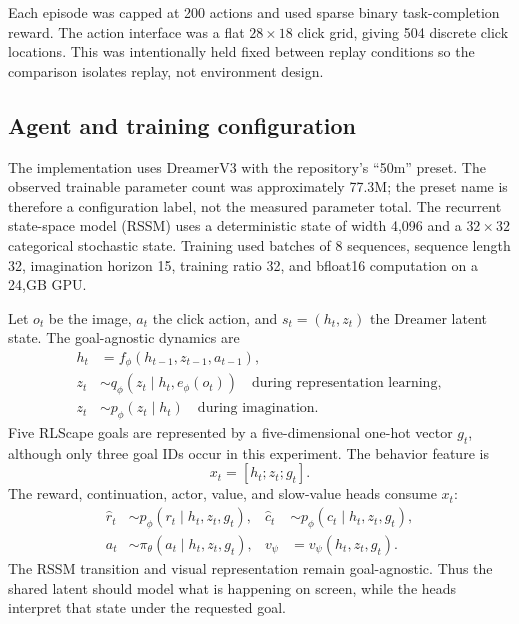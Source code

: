 \documentclass[10pt]{article}
\begin{document}
Each episode was capped at 200 actions and used sparse binary task-completion reward. The action interface was a flat $28\times18$ click grid, giving 504 discrete click locations. This was intentionally held fixed between replay conditions so the comparison isolates replay, not environment design.

\subsection{Agent and training configuration}

The implementation uses DreamerV3 \citep{hafner2023dreamerv3} with the repository's ``50m'' preset. The observed trainable parameter count was approximately 77.3M; the preset name is therefore a configuration label, not the measured parameter total. The recurrent state-space model (RSSM) uses a deterministic state of width 4,096 and a $32\times32$ categorical stochastic state. Training used batches of 8 sequences, sequence length 32, imagination horizon 15, training ratio 32, and bfloat16 computation on a 24,GB GPU.

Let $o_t$ be the image, $a_t$ the click action, and $s_t=(h_t,z_t)$ the Dreamer latent state. The goal-agnostic dynamics are
\begin{align}
 h_t &= f_\phi(h_{t-1},z_{t-1},a_{t-1}),\\
 z_t &\sim q_\phi(z_t\mid h_t,e_\phi(o_t)) \quad\text{during representation learning},\\
 z_t &\sim p_\phi(z_t\mid h_t) \quad\text{during imagination}.
\end{align}
Five RLScape goals are represented by a five-dimensional one-hot vector $g_t$, although only three goal IDs occur in this experiment. The behavior feature is
\begin{equation}
 x_t=[h_t;z_t;g_t].
\end{equation}
The reward, continuation, actor, value, and slow-value heads consume $x_t$:
\begin{align}
 \hat r_t&\sim p_\phi(r_t\mid h_t,z_t,g_t), &
 \hat c_t&\sim p_\phi(c_t\mid h_t,z_t,g_t),\\
 a_t&\sim\pi_\theta(a_t\mid h_t,z_t,g_t), &
 v_\psi&=v_\psi(h_t,z_t,g_t).
\end{align}
The RSSM transition and visual representation remain goal-agnostic. Thus the shared latent should model what is happening on screen, while the heads interpret that state under the requested goal.
\end{document}
